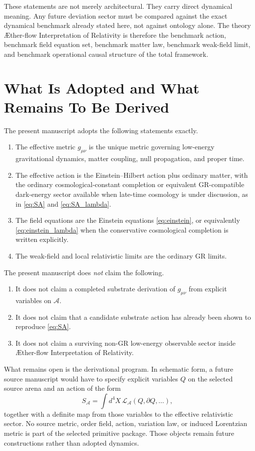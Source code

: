 \documentclass[11pt]{article}
\newcommand{\Aflow}{\AE{}ther-flow}
\newcommand{\TheoryName}{\Aflow{} Interpretation of Relativity}
\newcommand{\Sub}{\mathcal{A}}
\begin{document}
These statements are not merely architectural. They carry direct dynamical meaning. Any future deviation sector must be compared against the exact dynamical benchmark already stated here, not against ontology alone. The theory \TheoryName{} is therefore the benchmark action, benchmark field equation set, benchmark matter law, benchmark weak-field limit, and benchmark operational causal structure of the total framework.

\section{What Is Adopted and What Remains To Be Derived}

The present manuscript adopts the following statements exactly.
\begin{enumerate}
    \item The effective metric \(g_{\mu\nu}\) is the unique metric governing low-energy gravitational dynamics, matter coupling, null propagation, and proper time.
    \item The effective action is the Einstein--Hilbert action plus ordinary matter, with the ordinary cosmological-constant completion or equivalent GR-compatible dark-energy sector available when late-time cosmology is under discussion, as in \eqref{eq:SA} and \eqref{eq:SA_lambda}.
    \item The field equations are the Einstein equations \eqref{eq:einstein}, or equivalently \eqref{eq:einstein_lambda} when the conservative cosmological completion is written explicitly.
    \item The weak-field and local relativistic limits are the ordinary GR limits.
\end{enumerate}

The present manuscript does \emph{not} claim the following.
\begin{enumerate}
    \item It does not claim a completed substrate derivation of \(g_{\mu\nu}\) from explicit variables on \(\Sub\).
    \item It does not claim that a candidate substrate action has already been shown to reproduce \eqref{eq:SA}.
    \item It does not claim a surviving non-GR low-energy observable sector inside \TheoryName{}.
\end{enumerate}

What remains open is the derivational program. In schematic form, a future
source manuscript would have to specify explicit variables \(Q\) on the
selected source arena and an action of the form
\begin{equation}
S_{\Sub}
=
\int d^4X\,\mathcal{L}_{\Sub}(Q,\partial Q,\ldots),
\label{eq:substrateaction}
\end{equation}
together with a definite map from those variables to the effective
relativistic sector. No source metric, order field, action, variation law, or
induced Lorentzian metric is part of the selected primitive package. Those
objects remain future constructions rather than adopted dynamics.
\end{document}
